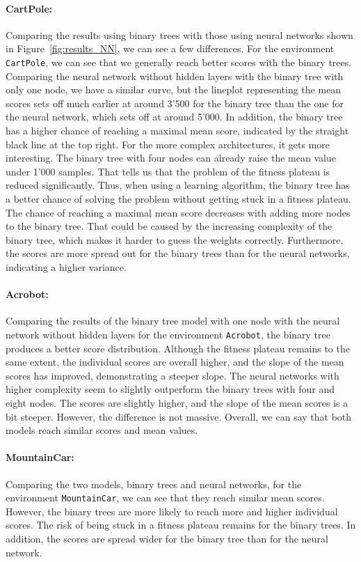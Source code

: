 \paragraph*{CartPole:} Comparing the results using binary trees with those using neural networks shown in Figure~\ref{fig:results_NN}, we can see a few differences. For the environment \verb|CartPole|, we can see that we generally reach  better scores with the binary trees. Comparing the neural network without hidden layers with the binary tree with only one node, we have a similar curve, but the lineplot representing the mean scores sets off much earlier at around 3'500 for the binary tree than the one for the neural network, which sets off at around 5'000. In addition, the binary tree has a higher chance of reaching a maximal mean score, indicated by the straight black line at the top right. For the more complex architectures, it gets more interesting. The binary tree with four nodes can already raise the mean value under 1'000 samples. That tells us that the problem of the fitness plateau is reduced significantly. Thus, when using a learning algorithm, the binary tree has a better chance of solving the problem without getting stuck in a fitness plateau. The chance of reaching a maximal mean score decreases with adding more nodes to the binary tree. That could be caused by the increasing complexity of the binary tree, which makes it harder to guess the weights correctly. Furthermore, the scores are more spread out for the binary trees than for the neural networks, indicating a higher variance.

\paragraph*{Acrobot:} Comparing the results of the binary tree model with one node with the neural network without hidden layers for the environment \verb|Acrobot|, the binary tree produces a better score distribution. Although the fitness plateau remains to the same extent, the individual scores are overall higher, and the slope of the mean scores has improved, demonstrating a steeper slope. The neural networks with higher complexity seem to slightly outperform the binary trees with four and eight nodes. The scores are slightly higher, and the slope of the mean scores is a bit steeper. However, the difference is not massive. Overall, we can say that both models reach similar scores and mean values.

\paragraph*{MountainCar:} Comparing the two models, binary trees and neural networks, for the environment \verb|MountainCar|, we can see that they reach similar mean scores. However, the binary trees are more likely to reach more and higher individual scores. The risk of being stuck in a fitness plateau remains for the binary trees. In addition, the scores are spread wider for the binary tree than for the neural network.

